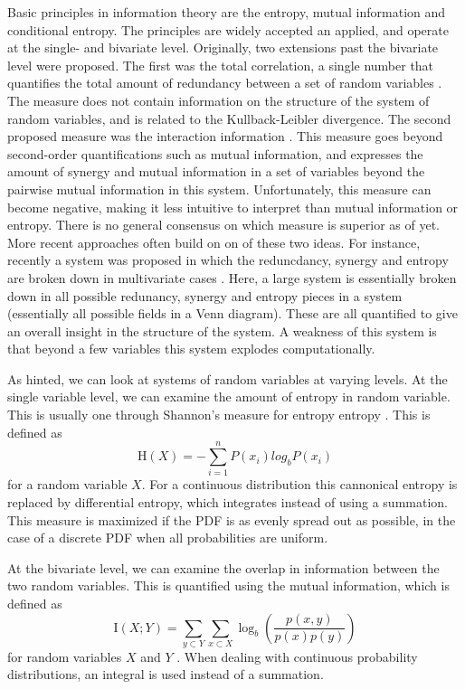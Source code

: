 \documentclass[../main.tex]{subfiles}
\begin{document}
Basic principles in information theory are the entropy, mutual information and conditional entropy.
The principles are widely accepted an applied, and operate at the single- and bivariate level.
Originally, two extensions past the bivariate level were proposed.
The first was the total correlation, a single number that quantifies the total amount of redundancy between a set of random variables \cite{watanabe1960information}. 
The measure does not contain information on the structure of the system of random variables, and is related to the Kullback-Leibler divergence.
The second proposed measure was the interaction information \cite{mcgill1954multivariate}. This measure goes beyond second-order quantifications such as mutual information, and expresses the amount of synergy and mutual information in a set of variables beyond the pairwise mutual information in this system. 
Unfortunately, this measure can become negative, making it less intuitive to interpret than mutual information or entropy.
There is no general consensus on which measure is superior as of yet\cite{williams2010nonnegative}.
More recent approaches often build on on of these two ideas.
For instance, recently a system was proposed in which the reduncdancy, synergy and entropy are broken down in multivariate cases \cite{williams2010nonnegative}.
Here, a large system is essentially broken down in all possible redunancy, synergy and entropy pieces in a system (essentially all possible fields in a Venn diagram).
These are all quantified to give an overall insight in the structure of the system.
A weakness of this system is that beyond a few variables this system explodes computationally.

As hinted, we can look at systems of random variables at varying levels.
At the single variable level, we can examine the amount of entropy in random variable.
This is usually one through Shannon's measure for entropy entropy \cite{shannon1949mathematical}.
This is defined as 
%
\begin{equation}
\mathrm{H}(X) = -\sum^n_{i=1} P(x_i) log_b P(x_i)
\end{equation}
%
for a random variable $X$.
For a continuous distribution this cannonical entropy is replaced by differential entropy, which integrates instead of using a summation.
This measure is maximized if the PDF is as evenly spread out as possible, in the case of a discrete PDF when all probabilities are uniform.

At the bivariate level, we can examine the overlap in information between the two random variables.
This is quantified using the mutual information, which is defined as 
%
\begin{equation}
\mathrm{I}(X;Y) = \sum_{y \subset Y} \sum_{x \subset X} \log_b (\frac{p(x,y)}{p(x) p(y)})
\end{equation}
%
for random variables $X$ and $Y$ \cite{cover2012elements}.
When dealing with continuous probability distributions, an integral is used instead of a summation.
\end{document}
